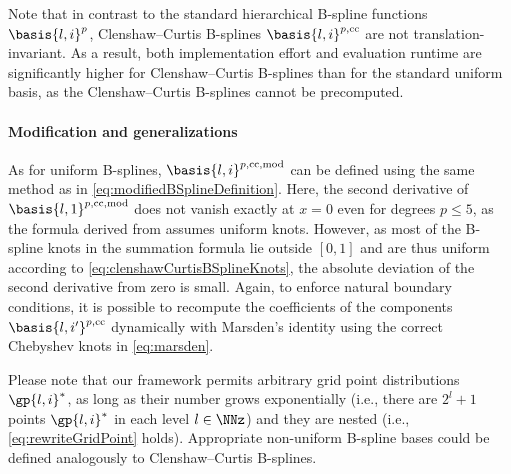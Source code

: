 Note that in contrast to the standard hierarchical B-spline functions
$\basis{l,i}^p$, Clenshaw--Curtis B-splines
$\basis{l,i}^{p,\clenshawcurtis}$ are not translation-invariant.
As a result, both implementation effort and evaluation runtime
are significantly higher for Clenshaw--Curtis B-splines than
for the standard uniform basis,
as the Clenshaw--Curtis B-splines cannot be precomputed.

\paragraph{Modification and generalizations}

As for uniform B-splines,
$\basis{l,i}^{p,\clenshawcurtis,\modified}$ can be defined using the
same method as in \eqref{eq:modifiedBSplineDefinition}.
Here, the second derivative of $\basis{l,1}^{p,\clenshawcurtis,\modified}$
does not vanish exactly at $x = 0$ even for degrees $p \le 5$,
as the formula derived from  assumes uniform knots.
However, as most of the B-spline knots in the summation formula
lie outside $[0, 1]$ and are thus uniform according
to \eqref{eq:clenshawCurtisBSplineKnots},
the absolute deviation of the second derivative from zero is small.
Again, to enforce natural boundary conditions,
it is possible to recompute the coefficients
of the components $\basis{l,i'}^{p,\clenshawcurtis}$
dynamically with Marsden's identity using the correct Chebyshev knots
in \eqref{eq:marsden}.

Please note that our framework permits arbitrary grid point distributions
$\gp{l,i}^\ast$,
as long as their number grows exponentially
(i.e., there are $2^l + 1$ points $\gp{l,i}^\ast$ in each level $l \in \NNz$)
and they are nested
(i.e., \eqref{eq:rewriteGridPoint} holds).
Appropriate non-uniform B-spline bases could be defined analogously
to Clenshaw--Curtis B-splines.
